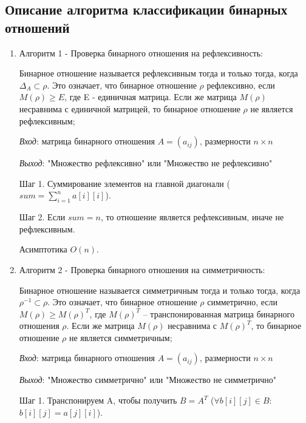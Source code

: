 \documentclass[spec, och, labwork]{shiza}
\begin{document}
        \subsection{Описание алгоритма классификации бинарных отношений}
            \begin{enumerate}

                \item Алгоритм 1 - Проверка бинарного отношения на рефлексивность:
                
                Бинарное отношение называется рефлексивным тогда и только тогда, когда $\Delta_A \subset \rho$. Это 
                означает, что бинарное отношение $\rho$ рефлексивно, если $M(\rho) \geq E$, где E - единичная матрица. 
                Если же матрица $M(\rho)$ несравнима с единичной матрицей, то бинарное отношение $\rho$ не является рефлексивным;

                \textit{Вход}: матрица бинарного отношения $A = (a_{ij})$, размерности $n \times n$

                \textit{Выход}: "Множество рефлексивно" или "Множество не рефлексивно"

                Шаг 1. Суммирование элементов на главной диагонали ($sum = \sum\limits_{i=1}^n a[i][i]$). 
                
                Шаг 2. Если $sum = n$, то отношение является рефлексивным, иначе не рефлексивным.

                Асимптотика $O(n)$.

                \item Алгоритм 2 - Проверка бинарного отношения на симметричность:
                
                Бинарное отношение называется симметричным тогда и только тогда, когда $\rho^{-1} \subset \rho$. Это означает, что бинарное 
                отношение $\rho$ симметрично, если $M(\rho) \geq M(\rho)^T$, где $M(\rho)^T$ – транспонированная матрица 
                бинарного отношения $\rho$. Если же матрица $M(\rho)$ несравнима с $M(\rho)^T$, то бинарное отношение $\rho$
                не является симметричным;
                
                \textit{Вход}: матрица бинарного отношения $A = (a_{ij})$, размерности $n \times n$

                \textit{Выход}: "Множество симметрично" или "Множество не симметрично"


                Шаг 1. Транспонируем A, чтобы получить $B = A^T$ ($\forall b[i][j] \in B:$ $b[i][j] = a[j][i]$).


\end{enumerate}
\end{document}
